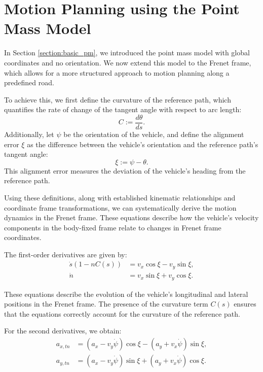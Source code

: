 \chapter{Motion Planning using the Point Mass Model} \label{ch:main-paper}

In Section \ref{section:basic_pm}, we introduced the point mass model with global coordinates and no orientation.
We now extend this model to the Frenet frame, which allows for a more structured approach to motion planning along a predefined road.

To achieve this, we first define the curvature of the reference path, which quantifies the rate of change of the tangent angle with respect to arc length:
\begin{equation}
	C := \frac{d\theta}{ds}.
\end{equation}
Additionally, let $\psi$ be the orientation of the vehicle, and define the alignment error $\xi$ as the difference between the vehicle's orientation and the reference path's tangent angle:
\begin{equation}
	\xi := \psi - \theta.
\end{equation}
This alignment error measures the deviation of the vehicle's heading from the reference path.

Using these definitions, along with established kinematic relationships and coordinate frame transformations, we can systematically derive the motion
dynamics in the Frenet frame.
These equations describe how the vehicle's velocity components in the body-fixed frame relate to changes in Frenet frame coordinates.

The first-order derivatives are given by:
\begin{align}
	\dot{s}(1 - nC(s)) & = v_x\cos{\xi} - v_y\sin{\xi}, \label{eq:first_derivative_long} \\
	\dot{n}            & = v_x\sin{\xi} + v_y\cos{\xi}. \label{eq:first_derivative_lat}
\end{align}

These equations describe the evolution of the vehicle's longitudinal and lateral positions in the Frenet frame.
The presence of the curvature term $C(s)$ ensures that the equations correctly account for the curvature of the reference path.

For the second derivatives, we obtain:
\begin{align}
	a_{x,tn} & = (a_x - v_y\dot{\psi})\cos{\xi} - (a_y + v_x\dot{\psi})\sin{\xi}, \label{eq:second_derivative_long} \\
	a_{y,tn} & = (a_x - v_y\dot{\psi})\sin{\xi} + (a_y + v_x\dot{\psi})\cos{\xi}. \label{eq:second_derivative_lat}
\end{align}

